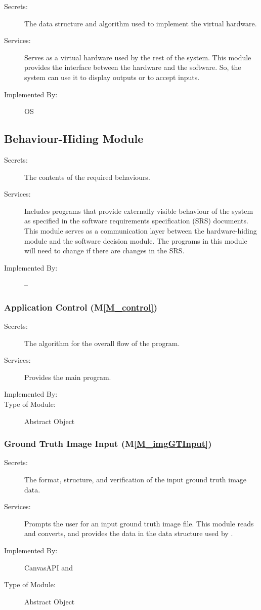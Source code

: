 \documentclass[12pt, titlepage]{article}
\newcommand{\mref}[1]{M\ref{#1}}
\begin{document}
\begin{description}
\item[Secrets:]The data structure and algorithm used to implement the virtual
  hardware.
\item[Services:]Serves as a virtual hardware used by the rest of the
  system. This module provides the interface between the hardware and the
  software. So, the system can use it to display outputs or to accept inputs.
\item[Implemented By:] OS
\end{description}

\subsection{Behaviour-Hiding Module}

\begin{description}
\item[Secrets:] The contents of the required behaviours.
\item[Services:] Includes programs that provide externally visible behaviour of
  the system as specified in the software requirements specification (SRS)
  documents. This module serves as a communication layer between the
  hardware-hiding module and the software decision module. The programs in this
  module will need to change if there are changes in the SRS.
\item[Implemented By:] --
\end{description}


\subsubsection{Application Control (\mref{M_control})}
\begin{description}
\item[Secrets:] The algorithm for the overall flow of the program.
\item[Services:] Provides the main program.
\item[Implemented By:] \progname{}
\item[Type of Module:] Abstract Object
\end{description}


\subsubsection{Ground Truth Image Input (\mref{M_imgGTInput})}
\begin{description}
\item[Secrets:] The format, structure, and verification of the input ground truth image data.
\item[Services:] Prompts the user for an input ground truth image file. This module reads and
  converts, and provides the data in the data structure used by \progname{}.
\item[Implemented By:] CanvasAPI and \progname{}
\item[Type of Module:] Abstract Object
\end{description}
\end{document}
